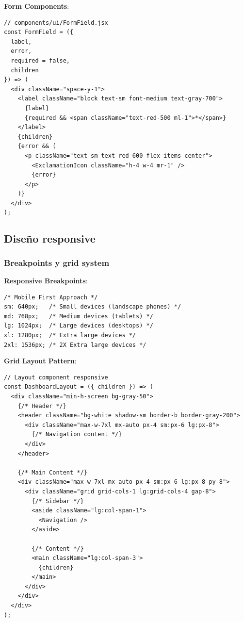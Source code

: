 \documentclass[12pt,a4paper,oneside]{report}
\begin{document}
\textbf{Form Components}:

\begin{lstlisting}
// components/ui/FormField.jsx
const FormField = ({ 
  label, 
  error, 
  required = false, 
  children 
}) => (
  <div className="space-y-1">
    <label className="block text-sm font-medium text-gray-700">
      {label}
      {required && <span className="text-red-500 ml-1">*</span>}
    </label>
    {children}
    {error && (
      <p className="text-sm text-red-600 flex items-center">
        <ExclamationIcon className="h-4 w-4 mr-1" />
        {error}
      </p>
    )}
  </div>
);
\end{lstlisting}

\subsection{Diseño responsive}\label{diseuxf1o-responsive}

\subsubsection{Breakpoints y grid
system}\label{breakpoints-y-grid-system}

\textbf{Responsive Breakpoints}:

\begin{lstlisting}
/* Mobile First Approach */
sm: 640px;   /* Small devices (landscape phones) */
md: 768px;   /* Medium devices (tablets) */
lg: 1024px;  /* Large devices (desktops) */
xl: 1280px;  /* Extra large devices */
2xl: 1536px; /* 2X Extra large devices */
\end{lstlisting}

\textbf{Grid Layout Pattern}:

\begin{lstlisting}
// Layout component responsive
const DashboardLayout = ({ children }) => (
  <div className="min-h-screen bg-gray-50">
    {/* Header */}
    <header className="bg-white shadow-sm border-b border-gray-200">
      <div className="max-w-7xl mx-auto px-4 sm:px-6 lg:px-8">
        {/* Navigation content */}
      </div>
    </header>
    
    {/* Main Content */}
    <div className="max-w-7xl mx-auto px-4 sm:px-6 lg:px-8 py-8">
      <div className="grid grid-cols-1 lg:grid-cols-4 gap-8">
        {/* Sidebar */}
        <aside className="lg:col-span-1">
          <Navigation />
        </aside>
        
        {/* Content */}
        <main className="lg:col-span-3">
          {children}
        </main>
      </div>
    </div>
  </div>
);
\end{lstlisting}
\end{document}
